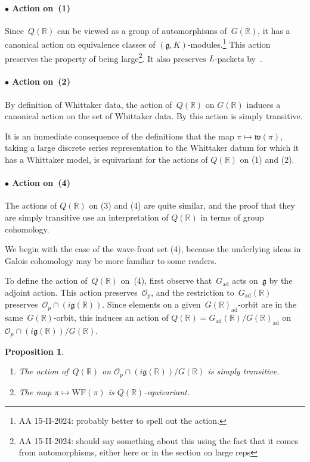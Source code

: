 \documentclass[10pt,leqno]{article}
\newtheorem{proposition}[equation]{Proposition}
\newcommand{\Gad}{G_\mathrm{ad}}
\renewcommand{\O}{\mathcal O}
\newcommand{\R}{\mathbb R}
\newcommand{\g}{\mathfrak g}
\newcommand{\w}{\mathfrak w}
\newcommand{\WF}{\mathrm{WF}}
\newcommand{\Op}{\O_p}
\begin{document}
\paragraph*{$\bullet$ Action on~(1)} Since~$Q(\R)$ can be viewed as a group of automorphisms of~$G(\R)$,  it has a canonical action on equivalence classes of $(\g, K)$-modules.\footnote{AA 15-II-2024: probably better to spell out the action.} This action preserves  the property of being large\footnote{AA 15-II-2024: should say something about this using the fact that it comes from automorphisms, either here or in the section on large reps}. It also preserves $L$-packets by~\cite[Lemma 6.18]{Contragredient}.

\paragraph*{$\bullet$ Action on~(2)}  By definition of Whittaker data, the action of~$Q(\R)$ on $G(\R)$ induces a canonical action on the set of Whittaker data. By \cite[(14.15)]{abv} this action is simply transitive. 

It is an immediate consequence of the definitions that the map $\pi \mapsto \w(\pi)$, taking a large discrete series representation to the Whittaker datum for which it has a Whittaker model, is equivariant for the actions of $Q(\R)$ on (1) and (2). 


\paragraph*{$\bullet$ Action on~(4)} The actions of $Q(\R)$ on (3) and (4) are quite similar, and the proof that they are simply transitive use an interpretation of $Q(\R)$ in terms of group cohomology. 

We begin with the case of the wave-front set (4), because the underlying ideas in Galois cohomology may be more familiar to some readers. 

To define the action of~$Q(\R)$ on~(4), first observe that~$\Gad$ acts on~$\g$ by the adjoint action. This action preserves~$\Op$, and the restriction to~$\Gad(\R)$ preserves~$\Op\cap (i\g(\R))$. Since elements on a given~$G(\R)_{\mathrm{ad}}$-orbit are in the same~$G(\R)$-orbit, this induces an action of $Q(\R)=\Gad(\R)/G(\R)_{\mathrm{ad}}$ on~$\Op\cap (i\g(\R))/G(\R)$.

\begin{proposition}
\begin{enumerate} 
\item The action of~$Q(\R)$ on $\Op\cap (i\g(\R))/G(\R)$ is simply transitive.
\item The map $\pi \mapsto \WF(\pi)$ is $Q(\R)$-equivariant.
\end{enumerate}
\end{proposition}
\end{document}
